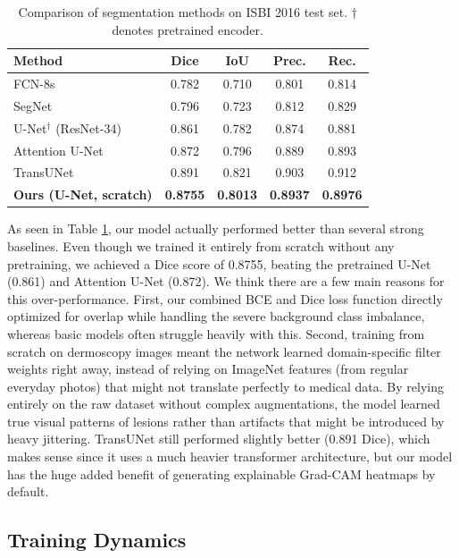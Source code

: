 \documentclass[10pt,journal,compsoc]{IEEEtran}
\begin{document}
\begin{table}[h]
\centering
\caption{Comparison of segmentation methods on ISBI 2016 test set. $\dagger$ denotes pretrained encoder.}
\label{tab:results}
\begin{tabular}{lcccc}
\toprule
\textbf{Method} & \textbf{Dice} & \textbf{IoU} & \textbf{Prec.} & \textbf{Rec.} \\
\midrule
FCN-8s \cite{fcn}                     & 0.782 & 0.710 & 0.801 & 0.814 \\
SegNet \cite{segnet}                   & 0.796 & 0.723 & 0.812 & 0.829 \\
U-Net$^\dagger$ (ResNet-34) \cite{unet} & 0.861 & 0.782 & 0.874 & 0.881 \\
Attention U-Net \cite{attunet}         & 0.872 & 0.796 & 0.889 & 0.893 \\
TransUNet \cite{transunet}             & 0.891 & 0.821 & 0.903 & 0.912 \\
\midrule
\textbf{Ours (U-Net, scratch)}         & \textbf{0.8755} & \textbf{0.8013} & \textbf{0.8937} & \textbf{0.8976} \\
\bottomrule
\end{tabular}
\end{table}

As seen in Table \ref{tab:results}, our model actually performed better than several strong baselines. Even though we trained it entirely from scratch without any pretraining, we achieved a Dice score of 0.8755, beating the pretrained U-Net (0.861) and Attention U-Net (0.872). We think there are a few main reasons for this over-performance. First, our combined BCE and Dice loss function directly optimized for overlap while handling the severe background class imbalance, whereas basic models often struggle heavily with this. Second, training from scratch on dermoscopy images meant the network learned domain-specific filter weights right away, instead of relying on ImageNet features (from regular everyday photos) that might not translate perfectly to medical data. By relying entirely on the raw dataset without complex augmentations, the model learned true visual patterns of lesions rather than artifacts that might be introduced by heavy jittering. TransUNet still performed slightly better (0.891 Dice), which makes sense since it uses a much heavier transformer architecture, but our model has the huge added benefit of generating explainable Grad-CAM heatmaps by default.

\subsection{Training Dynamics}
\end{document}
